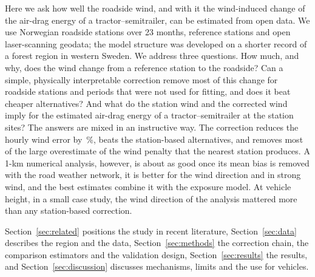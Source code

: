 Here we ask how well the roadside wind, and with it the wind-induced change of the air-drag energy of a tractor--semitrailer, can be estimated from open data. We use \noTrv{} Norwegian roadside stations over 23 months, \noRef{} reference stations and open laser-scanning geodata; the model structure was developed on a shorter record of a forest region in western Sweden. We address three questions. How much, and why, does the wind change from a reference station to the roadside? Can a simple, physically interpretable correction remove most of this change for roadside stations and periods that were not used for fitting, and does it beat cheaper alternatives? And what do the station wind and the corrected wind imply for the estimated air-drag energy of a tractor--semitrailer at the station sites? The answers are mixed in an instructive way. The correction reduces the hourly wind error by \noCvRed\,\%, beats the station-based alternatives, and removes most of the large overestimate of the wind penalty that the nearest station produces. A 1-km numerical analysis, however, is about as good once its mean bias is removed with the road weather network, it is better for the wind direction and in strong wind, and the best estimates combine it with the exposure model. At vehicle height, in a small case study, the wind direction of the analysis mattered more than any station-based correction.

Section~\ref{sec:related} positions the study in recent literature, Section~\ref{sec:data} describes the region and the data, Section~\ref{sec:methods} the correction chain, the comparison estimators and the validation design, Section~\ref{sec:results} the results, and Section~\ref{sec:discussion} discusses mechanisms, limits and the use for vehicles.
